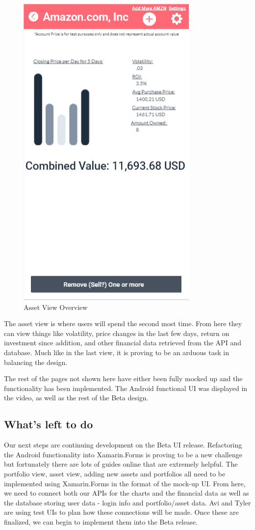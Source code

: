 \documentclass[letterpaper,10pt,titlepage,journal,compsoc,draftclsnofoot,onecolumn]{IEEEtran}
\begin{document}
\begin{figure}
   \caption{Asset View Overview}
   \begin{center}
   \includegraphics[width=.35\textwidth]{asset_screenshot}
\end{center}
\end{figure}

The asset view is where users will spend the second most time. From here they can view things like volatility, price changes in the last few days, return on investment since addition, and other financial data retrieved from the API and database. Much like in the last view, it is proving to be an arduous task in balancing the design.

The rest of the pages not shown here have either been fully mocked up and the functionality has been implemented. The Android functional UI was displayed in the video, as well as the rest of the Beta design. 

\subsection{What's left to do}

Our next steps are continuing development on the Beta UI release. Refactoring the Android functionality into Xamarin.Forms is proving to be a new challenge but fortunately there are lots of guides online that are extremely helpful. The portfolio view, asset view, adding new assets and portfolios all need to be implemented using Xamarin.Forms in the format of the mock-up UI. From here, we need to connect both our APIs for the charts and the financial data as well as the database storing user data - login info and portfolio/asset data. Avi and Tyler are using test UIs to plan how these connections will be made. Once these are finalized, we can begin to implement them into the Beta release.
\end{document}
